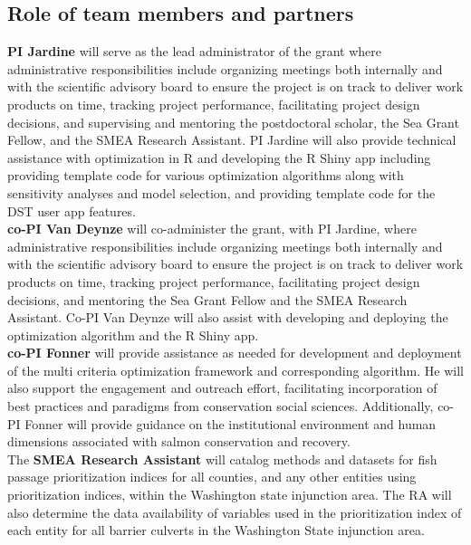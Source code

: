 \documentclass[12pt]{elsarticle}
\begin{document}
\subsection{Role of team members and partners}
\textbf{PI Jardine} will serve as the lead administrator of the grant where administrative responsibilities include organizing meetings both internally and with the scientific advisory board to ensure the project is on track to deliver work products on time, tracking project performance, facilitating project design decisions, and supervising and mentoring the postdoctoral scholar, the Sea Grant Fellow, and the SMEA Research Assistant.  PI Jardine will also provide technical assistance with optimization in R and developing the R Shiny app including providing template code for various optimization algorithms along with sensitivity analyses and model selection, and providing template code for the DST user app features.\\


\textbf{co-PI Van Deynze} will co-administer the grant, with PI Jardine, where administrative responsibilities include organizing meetings both internally and with the scientific advisory board to ensure the project is on track to deliver work products on time, tracking project performance, facilitating project design decisions, and mentoring the Sea Grant Fellow and the SMEA Research Assistant. Co-PI Van Deynze will also assist with developing and deploying the optimization algorithm and the R Shiny app. \\

\textbf{co-PI Fonner} will provide assistance as needed for development and deployment of the multi criteria optimization framework and corresponding algorithm. He will also support the engagement and outreach effort, facilitating incorporation of best practices and paradigms from conservation social sciences. Additionally, co-PI Fonner will provide guidance on the institutional environment and human dimensions associated with salmon conservation and recovery.\\

The \textbf{SMEA Research Assistant} will catalog methods and datasets for fish passage prioritization indices for all counties, and any other entities using prioritization indices, within the Washington state injunction area. The RA will also determine the data availability of variables used in the prioritization index of each entity for all barrier culverts in the Washington State injunction area.\\
\end{document}
